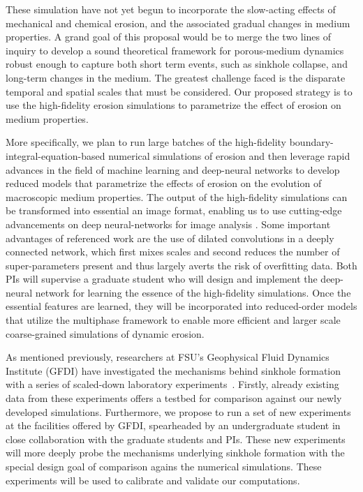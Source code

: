 \documentclass[11pt]{article}
\begin{document}
These simulation have not yet begun to incorporate the slow-acting effects of mechanical and chemical erosion, and the associated gradual changes in medium properties. A grand goal of this proposal would be to merge the two lines of inquiry to develop a sound theoretical framework for porous-medium dynamics robust enough to capture both short term events, such as sinkhole collapse, and long-term changes in the medium. The greatest challenge faced is the disparate temporal and spatial scales that must be considered. Our proposed strategy is to use the high-fidelity erosion simulations to parametrize the effect of erosion on medium properties.

	More specifically, we plan to run large batches of the high-fidelity boundary-integral-equation-based numerical simulations of erosion and then leverage rapid advances in the field of machine learning and deep-neural networks to develop reduced models that parametrize the effects of erosion on the evolution of macroscopic medium properties. The output of the high-fidelity simulations can be transformed into essential an image format, enabling us to use cutting-edge advancements on deep neural-networks for image analysis \cite{pelt2018mixed}. Some important advantages of referenced work are the use of dilated convolutions in a deeply connected network, which first mixes scales and second reduces the number of super-parameters present and thus largely averts the risk of overfitting data. Both PIs will supervise a graduate student who will design and implement the deep-neural network for learning the essence of the high-fidelity simulations. Once the essential features are learned, they will be incorporated into reduced-order models that utilize the multiphase framework to enable more efficient and larger scale coarse-grained simulations of dynamic erosion.

As mentioned previously, researchers at FSU's Geophysical Fluid Dynamics Institute (GFDI) have investigated the mechanisms behind sinkhole formation with a series of scaled-down laboratory experiments~\cite{tao2014experimental}. Firstly, already existing data from these experiments offers a testbed for comparison against our newly developed simulations. Furthermore, we propose to run a set of new experiments at the facilities offered by GFDI, spearheaded by an undergraduate student in close collaboration with the graduate students and PIs. These new experiments will more deeply probe the mechanisms underlying sinkhole formation with the special design goal of comparison agains the numerical simulations. These experiments will be used to calibrate and validate our computations.
\end{document}
